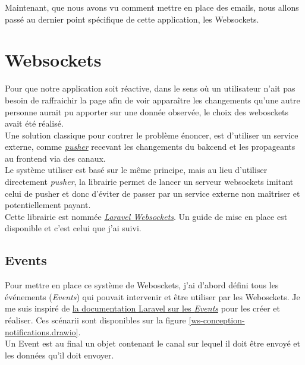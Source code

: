 \documentclass[
    iai, %
    il, %
]{heig-tb}
\begin{document}
Maintenant, que nous avons vu comment mettre en place des emails, nous allons passé au dernier point spécifique de cette application, les Websockets.

\section{Websockets}
Pour que notre application soit réactive, dans le sens où un utilisateur n'ait pas besoin de raffraichir la page afin de voir apparaître les changements qu'une autre personne aurait pu apporter sur une donnée observée, le choix des webosckets avait été réalisé. \\
Une solution classique pour contrer le problème énoncer, est d'utiliser un service externe, comme \href{https://pusher.com/}{\emph{pusher}} recevant les changements du bakcend et les propageants au frontend via des canaux. \\
Le système utiliser est basé sur le même principe, mais au lieu d'utiliser directement \emph{pusher}, la librairie permet de lancer un serveur websockets imitant celui de pusher et donc d'éviter de passer par un service externe non maîtriser et potentiellement payant. \\
Cette librairie est nommée \href{https://beyondco.de/docs/laravel-websockets/getting-started/introduction}{\emph{Laravel Websockets}}. Un guide de mise en place est disponible et c'est celui que j'ai suivi.

\subsection{Events}

Pour mettre en place ce système de Webosckets, j'ai d'abord défini tous les événements (\emph{Events}) qui pouvait intervenir et être utiliser par les Webosckets. Je me suis inspiré de \href{https://laravel.com/docs/9.x/events}{la documentation Laravel sur les \emph{Events}} pour les créer et réaliser.
Ces scénarii sont disponibles sur la figure \ref{ws-conception-notifications.drawio}. \\
Un Event est au final un objet contenant le canal sur lequel il doit être envoyé et les données qu'il doit envoyer.
\end{document}

